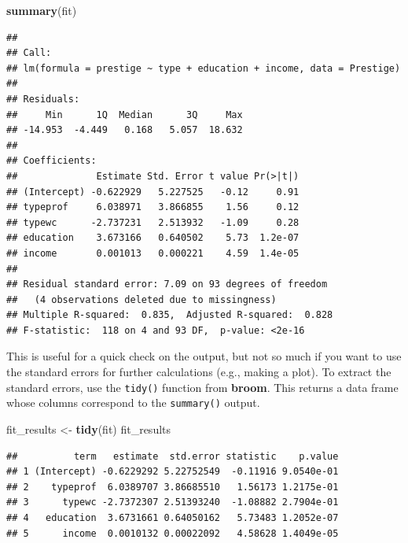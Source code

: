 \documentclass[12pt,oneside,openany]{book}
\newenvironment{Shaded}{\begin{snugshade}}{\end{snugshade}}
\newcommand{\KeywordTok}[1]{\textcolor[rgb]{0.13,0.29,0.53}{\textbf{#1}}}
\newcommand{\StringTok}[1]{\textcolor[rgb]{0.31,0.60,0.02}{#1}}
\newcommand{\OperatorTok}[1]{\textcolor[rgb]{0.81,0.36,0.00}{\textbf{#1}}}
\newcommand{\NormalTok}[1]{#1}
\begin{document}
\begin{Shaded}
\begin{Highlighting}[]
\KeywordTok{summary}\NormalTok{(fit)}
\end{Highlighting}
\end{Shaded}

\begin{verbatim}
## 
## Call:
## lm(formula = prestige ~ type + education + income, data = Prestige)
## 
## Residuals:
##     Min      1Q  Median      3Q     Max 
## -14.953  -4.449   0.168   5.057  18.632 
## 
## Coefficients:
##              Estimate Std. Error t value Pr(>|t|)
## (Intercept) -0.622929   5.227525   -0.12     0.91
## typeprof     6.038971   3.866855    1.56     0.12
## typewc      -2.737231   2.513932   -1.09     0.28
## education    3.673166   0.640502    5.73  1.2e-07
## income       0.001013   0.000221    4.59  1.4e-05
## 
## Residual standard error: 7.09 on 93 degrees of freedom
##   (4 observations deleted due to missingness)
## Multiple R-squared:  0.835,  Adjusted R-squared:  0.828 
## F-statistic:  118 on 4 and 93 DF,  p-value: <2e-16
\end{verbatim}

This is useful for a quick check on the output, but not so much if you
want to use the standard errors for further calculations (e.g., making a
plot). To extract the standard errors, use the \texttt{tidy()} function
from \textbf{broom}. This returns a data frame whose columns correspond
to the \texttt{summary()} output.

\begin{Shaded}
\begin{Highlighting}[]
\NormalTok{fit_results <-}\StringTok{ }\KeywordTok{tidy}\NormalTok{(fit)}
\NormalTok{fit_results}
\end{Highlighting}
\end{Shaded}

\begin{verbatim}
##          term   estimate  std.error statistic    p.value
## 1 (Intercept) -0.6229292 5.22752549  -0.11916 9.0540e-01
## 2    typeprof  6.0389707 3.86685510   1.56173 1.2175e-01
## 3      typewc -2.7372307 2.51393240  -1.08882 2.7904e-01
## 4   education  3.6731661 0.64050162   5.73483 1.2052e-07
## 5      income  0.0010132 0.00022092   4.58628 1.4049e-05
\end{verbatim}

\begin{Shaded}
\end{Shaded}
\end{document}
